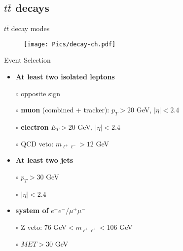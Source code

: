 \documentclass{beamer}
\newcommand{\ttbar}{
	\ensuremath{t\bar{t}}
}
\begin{document}
\subsection{$\ttbar$ decays}
\begin{frame}[t]{$\ttbar$ decay modes}
		\begin{figure}[H]
		\texttt{[image: Pics/decay-ch.pdf]}
		\end{figure}
\end{frame}

\begin{frame}[t]{Event Selection}
	\begin{itemize}
		\item{\bf At least two isolated leptons}
		\item[$\circ$]{opposite sign}
		\item[$\circ$]{{\bf muon} (combined + tracker): $p_T > 20$ GeV, $|\eta| < 2.4$}
		\item[$\circ$]{{\bf electron} $E_T > 20$ GeV, $|\eta| < 2.4$}
		\item[$\circ$]{{QCD veto}: $m_{\ell^+\ell^-} > 12$ GeV}
		\item{\bf At least two jets} 
		\item[$\circ$]{$p_T > 30$ GeV}
		\item[$\circ$]{$|\eta| < 2.4$}
		\item{{\bf system of} $e^+e^-/\mu^+\mu^-$}
		\item[$\circ$]{Z veto: 76 GeV$ < m_{\ell^+\ell^+} < 106$ GeV}
		\item[$\circ$]{$MET > 30$ GeV}
	\end{itemize}
\end{frame}
\end{document}
